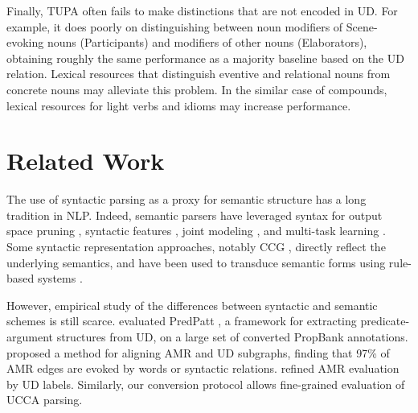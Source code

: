 \documentclass[11pt,a4paper]{article}
\begin{document}
Finally, TUPA often fails to make distinctions that are not encoded
in UD. For example, it does poorly on distinguishing between noun modifiers of
Scene-evoking nouns (Participants) and modifiers of other nouns (Elaborators),
obtaining roughly the same performance as 
a majority baseline based on the UD relation.
Lexical resources that distinguish eventive and relational nouns from concrete 
nouns may alleviate this problem.
In the similar case of compounds, lexical resources for light verbs and idioms may increase performance.


\section{Related Work}\label{sec:related_work}

The use of syntactic parsing as a proxy for semantic structure has a long tradition in NLP.
Indeed, semantic parsers have leveraged syntax
for output space pruning \cite{xue2004calibrating}, 
syntactic features \cite{gildea2002automatic,N15-1007,E17-1045}, 
joint modeling \cite{surdeanu2008conll,hajivc2009conll}, and
multi-task learning \cite{swayamdipta2016greedy,swayamdipta2018syntactic,strubell2018linguistically}.
Some syntactic representation approaches, notably CCG \cite{Steedman:00},
directly reflect the underlying semantics, and have been used to
transduce semantic forms using rule-based systems \cite{Basile:12}.


  
However, empirical study of
the differences between syntactic and semantic schemes is still scarce.
 evaluated PredPatt \citep{white2016universal},
a framework for extracting predicate-argument structures from UD,
on a large set of converted PropBank annotations.
 proposed a method for aligning AMR and UD subgraphs,
finding that 97\% of AMR edges are evoked by words or syntactic relations.
 refined AMR evaluation by UD labels.
Similarly, our conversion protocol allows fine-grained evaluation of UCCA parsing.
\end{document}
